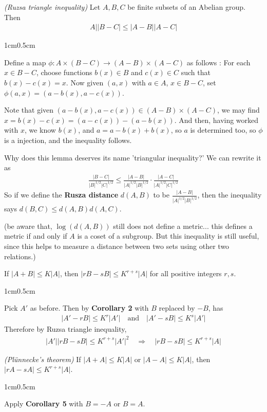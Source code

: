 \documentclass[10pt,a4paper]{report}
\newenvironment{proof}
{\begin{changemargin}{1cm}{0.5cm}
	}%
	{\end{changemargin}
}
\begin{document}
 \emph{(Ruzsa triangle inequality)} Let $A,B,C$ be finite subsets of an Abelian group. Then 
\begin{align*}
A||B-C| \leq |A-B||A-C|
\end{align*}
\begin{proof}
\pf  Define a map $\phi : A \times (B-C) \rightarrow (A-B) \times (A-C)$ as follows : For each $x \in B-C$, choose functions $b(x)\in B$ and $c(x) \in C$ such that $b(x) - c(x) =x$. Now given $(a,x)$ with $a\in A$, $x\in B-C$, set $\phi(a,x) = (a-b(x), a-c(x))$.

\quad Note that given $(a-b(x), a-c(x))\in (A-B)\times (A-C)$, we may find $x = b(x)-c(x) = (a-c(x))- (a-b(x))$. And then, having worked with $x$, we know $b(x)$, and $a = a-b(x)+b(x)$, so $a$ is determined too, so $\phi$ is a injection, and the inequality follows.

\eop
\end{proof}
\s

Why does this lemma deserves its name 'triangular inequality?' We can rewrite it as
\begin{align*}
\frac{|B-C|}{|B|^{1/2} |C|^{1/2}} \leq \frac{|A-B|}{|A|^{1/2}|B|^{1/2}} \cdot \frac{|A-C|}{|A|^{1/2}|C|^{1/2}}
\end{align*}
So if we define the \textbf{Rusza distance} $d(A,B)$ to be $\frac{|A-B|}{|A|^{1/2}|B|^{1/2}}$, then the inequality says $d(B,C) \leq d(A,B)d(A,C)$.

(be aware that, $\log(d(A,B))$ still does not define a metric... this defines a metric if and only if $A$ is a coset of a subgroup. But this inequality is still useful, since this helps to measure a distance between two sets using other two relations.)
\s

 If $|A+B| \leq K|A|$, then $|rB-sB| \leq K^{r+s}|A|$ for all positive integers $r,s$.
\begin{proof}
\pf Pick $A'$ as before. Then by \textbf{Corollary 2} with $B$ replaced by $-B$, has
\begin{align*}
|A'-rB| \leq K^r |A'| \quad \text{and} \quad |A'-sB|\leq K^s |A'|
\end{align*}
Therefore by Ruzsa triangle inequality,
\begin{align*}
|A'||rB-sB| \leq K^{r+s} |A'|^2 \quad \Rightarrow \quad |rB-sB| \leq K^{r+s}|A|
\end{align*}

\eop
\end{proof}
\s

 \emph{(Pl\"{u}nnecke's theorem)} If $|A+A| \leq K|A|$ or $|A-A| \leq K|A|$, then $|rA-sA| \leq K^{r+s} |A|$.
\begin{proof}
\pf Apply \textbf{Corollary 5} with $B= -A$ or $B=A$.

\eop
\end{proof}
\s
\end{document}
